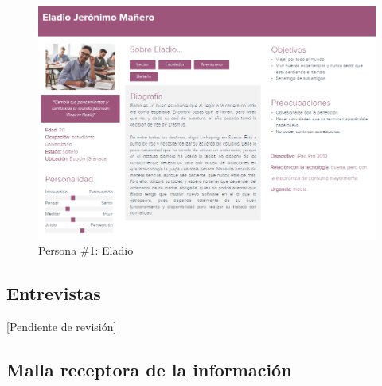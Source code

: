 \begin{figure}
	\centering
	\includegraphics[width=\textwidth]{img/Personas/Eladio}
	\caption[Persona \#1]{Persona \#1: Eladio}
	\label{fig:persona1}
\end{figure}


\subsection{Entrevistas}
[Pendiente de revisión]

\subsection{Malla receptora de la información}




%
%
%
